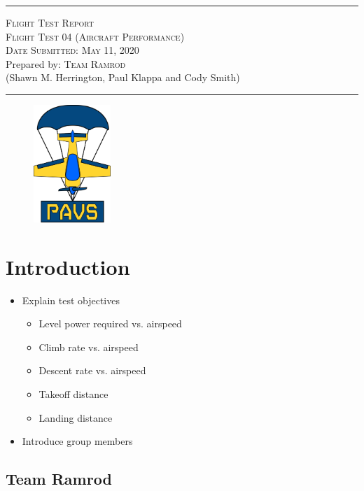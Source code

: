 \documentclass[conf]{new-aiaa}
\begin{document}
\begin{titlepage}

	\centering
	\vspace*{\fill}
	\rule{\textwidth}{0.4pt}
	\textsc{\huge Flight Test Report \\}
	\textsc{\huge Flight Test 04 (Aircraft Performance) \\}
	\bigskip
	\textsc{\large Date Submitted: May 11, 2020\\}
	\bigskip
	{\large Prepared by: \textsc{\huge Team Ramrod}\\}
	{(Shawn M. Herrington, Paul Klappa and Cody Smith)}	
	\rule{\textwidth}{0.4pt}
	
	\vspace*{\fill}	
	
	\begin{figure}[hbt!]
		\centering
		\includegraphics[height=1.75in]{PAVSLogo_BlackOutline.png}
		\label{PAVSLOGO}
	\end{figure}	
		
\end{titlepage}

\section{Introduction}

\begin{itemize}
	\item Explain test objectives
	\begin{itemize}
		\item Level power required vs. airspeed
		\item Climb rate vs. airspeed
		\item Descent rate vs. airspeed
		\item Takeoff distance
		\item Landing distance
	\end{itemize}
	\item Introduce group members
\end{itemize}

\subsection{Team Ramrod}
\end{document}

